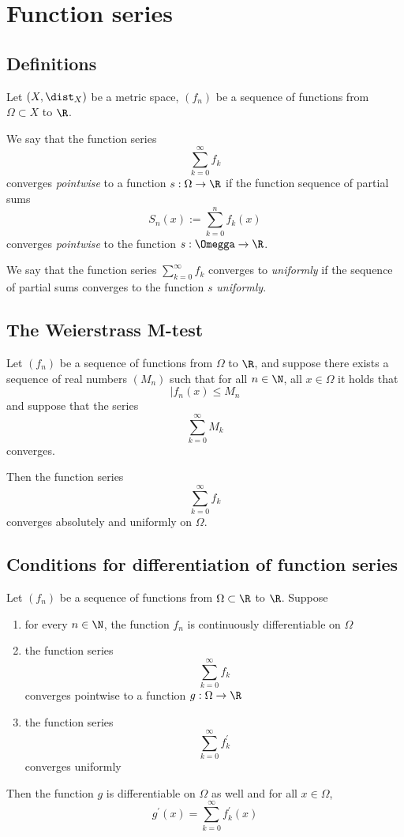 \section{Function series}

\subsection{Definitions}
\begin{definition}
    Let $(X,\dist_X)$ be a metric space, $(f_n)$ be a sequence of functions from $\Omega \subset X$ to $\R$.

    We say that the function series
    $$\sum_{k=0}^\infty f_k$$
    converges \emph{pointwise} to a function $s: \Omega \to \R$ if the function sequence of partial sums
    $$S_n(x) := \sum_{k=0}^n f_k(x)$$
    converges \emph{pointwise} to the function $s: \Omegga \to \R$.

    We say that the function series $\sum_{k=0}^\infty f_k$ converges to \emph{uniformly} if the 
    sequence of partial sums converges to the function $s$ \emph{uniformly}.
\end{definition}

\subsection{The Weierstrass M-test}
\begin{theorem}
    Let $(f_n)$ be a sequence of functions from $\Omega$ to $\R$, and suppose there exists a sequence
    of real numbers $(M_n)$ such that for all $n \in \N$, all $x \in \Omega$ it holds that
    $$|f_n(x) \le M_n$$
    and suppose that the series 
    $$\sum_{k=0}^\infty M_k$$
    converges.

    Then the function series
    $$\sum_{k=0}^\infty f_k$$
    converges absolutely and uniformly on $\Omega$.
\end{theorem}

\subsection{Conditions for differentiation of function series}
\begin{theorem}
    Let $(f_n)$ be a sequence of functions from $\Omega \subset \R$ to $\R$.
    Suppose 
    \begin{enumerate}
        \item for every $n \in \N$, the function $f_n$ is continuously differentiable on $\Omega$
        \item the function series
            $$\sum_{k=0}^\infty f_k$$
            converges pointwise to a function $g: \Omega \to \R$
        \item the function series
            $$\sum_{k=0}^\infty f^\prime_k$$
            converges uniformly
    \end{enumerate}

    Then the function $g$ is differentiable on $\Omega$ as well and for all $x \in \Omega$,
    $$g^\prime(x) = \sum_{k=0}^\infty f^\prime_k(x)$$
\end{theorem}
